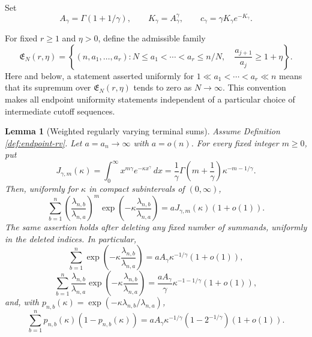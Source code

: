 \documentclass[11pt]{article}
\newtheorem{lemma}[theorem]{Lemma}
\theoremstyle{remark}
\newcommand{\dd}{\,d}
\begin{document}
Set
\[
        A_\gamma=\Gamma(1+1/\gamma),
        \qquad
        K_\gamma=A_\gamma^\gamma,
        \qquad
        c_\gamma=\gamma K_\gamma e^{-K_\gamma}.
\]

For fixed \(r\ge1\) and \(\eta>0\), define the admissible family
\[
\mathfrak E_N(r,\eta)=
\left\{
(n,a_1,\ldots,a_r):
N\le a_1<\cdots<a_r\le n/N,\quad
\frac{a_{j+1}}{a_j}\ge1+\eta
\right\}.
\]
Here and below, a statement asserted uniformly for
\(1\ll a_1<\cdots<a_r\ll n\) means that its supremum over
\(\mathfrak E_N(r,\eta)\) tends to zero as \(N\to\infty\).  This convention
makes all endpoint uniformity statements independent of a particular choice of
intermediate cutoff sequences.

\begin{lemma}[Weighted regularly varying terminal sums]
\label{lem:endpoint-rv-sums}
Assume Definition \ref{def:endpoint-rv}.  Let \(a=a_n\to\infty\) with
\(a=o(n)\).  For every fixed integer \(m\ge0\), put
\[
J_{\gamma,m}(\kappa)
 =\int_0^\infty x^{m\gamma}e^{-\kappa x^\gamma}\dd x
 =\frac1\gamma\Gamma\!\left(m+\frac1\gamma\right)
  \kappa^{-m-1/\gamma}.
\]
Then, uniformly for \(\kappa\) in compact subintervals of \((0,\infty)\),
\[
\sum_{b=1}^n
\left(\frac{\lambda_{n,b}}{\lambda_{n,a}}\right)^m
\exp\left(-\kappa\frac{\lambda_{n,b}}{\lambda_{n,a}}\right)
 =aJ_{\gamma,m}(\kappa)(1+o(1)).
\tag{8.1}\label{eq:endpoint-weighted-sums}
\]
The same assertion holds after deleting any fixed number of summands, uniformly
in the deleted indices.  In particular,
\[
\sum_{b=1}^n
\exp\left(-\kappa\frac{\lambda_{n,b}}{\lambda_{n,a}}\right)
 =aA_\gamma\kappa^{-1/\gamma}(1+o(1)),
\tag{8.2}\label{eq:endpoint-sum-zero}
\]
\[
\sum_{b=1}^n
\frac{\lambda_{n,b}}{\lambda_{n,a}}
\exp\left(-\kappa\frac{\lambda_{n,b}}{\lambda_{n,a}}\right)
 =\frac{aA_\gamma}{\gamma}
 \kappa^{-1-1/\gamma}(1+o(1)),
\tag{8.3}\label{eq:endpoint-sum-one}
\]
and, with
\(p_{n,b}(\kappa)=
\exp(-\kappa\lambda_{n,b}/\lambda_{n,a})\),
\[
\sum_{b=1}^n p_{n,b}(\kappa)(1-p_{n,b}(\kappa))
 =aA_\gamma\kappa^{-1/\gamma}
 (1-2^{-1/\gamma})(1+o(1)).
\tag{8.4}\label{eq:endpoint-variance-sum}
\]
\end{lemma}
\end{document}

